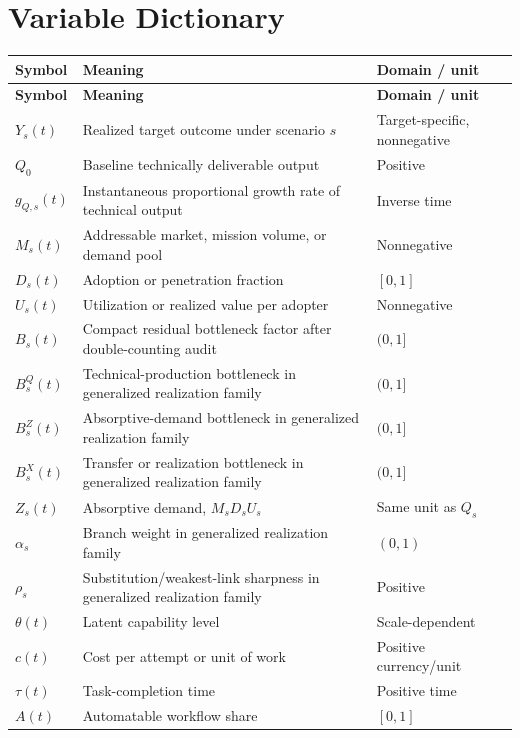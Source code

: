 
\section{Variable Dictionary}
\label{app:variables}

\small
\begin{longtable}{>{\raggedright\arraybackslash}p{}>{\raggedright\arraybackslash}p{}>{\raggedright\arraybackslash}p{}}
\toprule
\textbf{Symbol} & \textbf{Meaning} & \textbf{Domain / unit}\\
\midrule
\endfirsthead
\toprule
\textbf{Symbol} & \textbf{Meaning} & \textbf{Domain / unit}\\
\midrule
\endhead
$Y_s(t)$ & Realized target outcome under scenario $s$ & Target-specific, nonnegative\\
$Q_0$ & Baseline technically deliverable output & Positive\\
$g_{Q,s}(t)$ & Instantaneous proportional growth rate of technical output & Inverse time\\
$M_s(t)$ & Addressable market, mission volume, or demand pool & Nonnegative\\
$D_s(t)$ & Adoption or penetration fraction & $[0,1]$\\
$U_s(t)$ & Utilization or realized value per adopter & Nonnegative\\
$B_s(t)$ & Compact residual bottleneck factor after double-counting audit & $(0,1]$\\
$B_s^Q(t)$ & Technical-production bottleneck in generalized realization family & $(0,1]$\\
$B_s^Z(t)$ & Absorptive-demand bottleneck in generalized realization family & $(0,1]$\\
$B_s^X(t)$ & Transfer or realization bottleneck in generalized realization family & $(0,1]$\\
$Z_s(t)$ & Absorptive demand, $M_sD_sU_s$ & Same unit as $Q_s$\\
$\alpha_s$ & Branch weight in generalized realization family & $(0,1)$\\
$\rho_s$ & Substitution/weakest-link sharpness in generalized realization family & Positive\\
$\theta(t)$ & Latent capability level & Scale-dependent\\
$c(t)$ & Cost per attempt or unit of work & Positive currency/unit\\
$\tau(t)$ & Task-completion time & Positive time\\
$A(t)$ & Automatable workflow share & $[0,1]$\\

\end{longtable}
